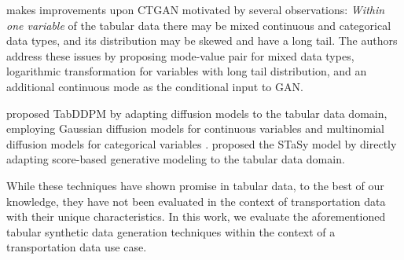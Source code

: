 \cite{ctab-gan} makes improvements upon CTGAN motivated by several observations: \emph{Within one variable} of the tabular data there may be mixed continuous and categorical data types, and its distribution may be skewed and have a long tail. The authors address these issues by proposing mode-value pair for mixed data types, logarithmic transformation for variables with long tail distribution, and an additional continuous mode as the conditional input to GAN.

\cite{kotelnikov2023tabddpm} proposed TabDDPM by adapting diffusion models to the tabular data domain, employing Gaussian diffusion models for continuous variables and multinomial diffusion models for categorical variables \cite{hoogeboom2021argmax}. \cite{kim2022stasy} proposed the STaSy model by directly adapting score-based generative modeling \cite{song2021scorebased_sde} to the tabular data domain.

While these techniques have shown promise in tabular data, to the best of our knowledge, they have not been evaluated in the context of transportation data with their unique characteristics. 
In this work, we evaluate the aforementioned tabular synthetic data generation techniques within the context of a transportation data use case.

